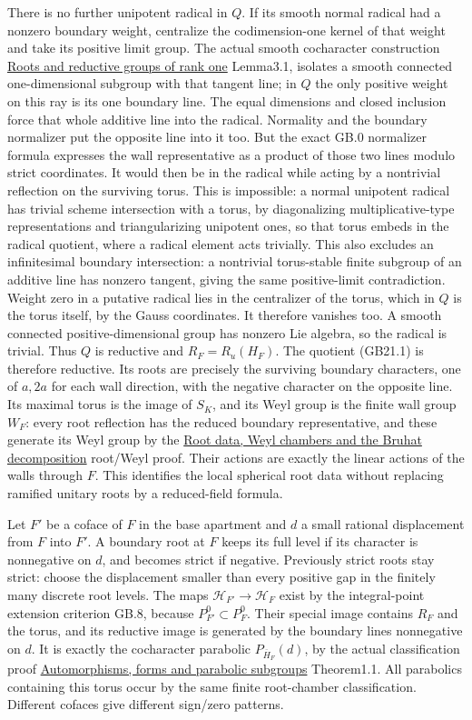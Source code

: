 \documentclass[
  11pt,
]{article}
\begin{document}
There is no further unipotent radical in \(Q\). If its smooth normal
radical had a nonzero boundary weight, centralize the codimension-one
kernel of that weight and take its positive limit group. The actual
smooth cocharacter construction \href{../AG-RG/AG-RG-03.html}{Roots and
reductive groups of rank one} Lemma3.1, isolates a smooth connected
one-dimensional subgroup with that tangent line; in \(Q\) the only
positive weight on this ray is its one boundary line. The equal
dimensions and closed inclusion force that whole additive line into the
radical. Normality and the boundary normalizer put the opposite line
into it too. But the exact GB.0 normalizer formula expresses the wall
representative as a product of those two lines modulo strict
coordinates. It would then be in the radical while acting by a
nontrivial reflection on the surviving torus. This is impossible: a
normal unipotent radical has trivial scheme intersection with a torus,
by diagonalizing multiplicative-type representations and triangularizing
unipotent ones, so that torus embeds in the radical quotient, where a
radical element acts trivially. This also excludes an infinitesimal
boundary intersection: a nontrivial torus-stable finite subgroup of an
additive line has nonzero tangent, giving the same positive-limit
contradiction. Weight zero in a putative radical lies in the centralizer
of the torus, which in \(Q\) is the torus itself, by the Gauss
coordinates. It therefore vanishes too. A smooth connected
positive-dimensional group has nonzero Lie algebra, so the radical is
trivial. Thus \(Q\) is reductive and \(R_F=R_u(H_F)\). The quotient
(GB21.1) is therefore reductive. Its roots are precisely the surviving
boundary characters, one of \(a,2a\) for each wall direction, with the
negative character on the opposite line. Its maximal torus is the image
of \(S_K\), and its Weyl group is the finite wall group \(W_F\): every
root reflection has the reduced boundary representative, and these
generate its Weyl group by the \href{../AG-RG/AG-RG-04.html}{Root data,
Weyl chambers and the Bruhat decomposition} root/Weyl proof. Their
actions are exactly the linear actions of the walls through \(F\). This
identifies the local spherical root data without replacing ramified
unitary roots by a reduced-field formula.

Let \(F'\) be a coface of \(F\) in the base apartment and \(d\) a small
rational displacement from \(F\) into \(F'\). A boundary root at \(F\)
keeps its full level if its character is nonnegative on \(d\), and
becomes strict if negative. Previously strict roots stay strict: choose
the displacement smaller than every positive gap in the finitely many
discrete root levels. The maps \(\mathcal H_{F'}\to\mathcal H_F\) exist
by the integral-point extension criterion GB.8, because
\(P_{F'}^0\subset P_F^0\). Their special image contains \(R_F\) and the
torus, and its reductive image is generated by the boundary lines
nonnegative on \(d\). It is exactly the cocharacter parabolic
\(P_{\overline H_F}(d)\), by the actual classification proof
\href{../AG-RG/AG-RG-06.html}{Automorphisms, forms and parabolic
subgroups} Theorem1.1. All parabolics containing this torus occur by the
same finite root-chamber classification. Different cofaces give
different sign/zero patterns.
\end{document}
